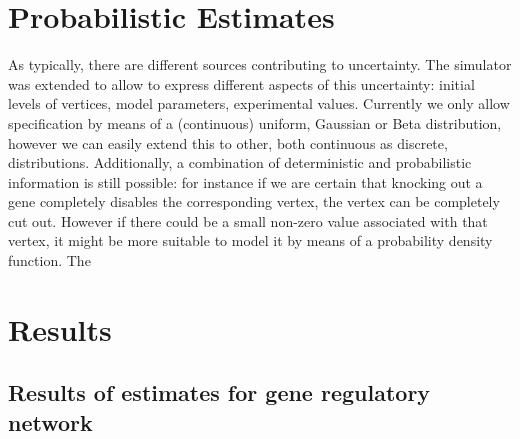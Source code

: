 \section{Probabilistic Estimates}
As typically, there are different sources contributing to uncertainty. The simulator was extended to allow to express different aspects of this uncertainty: initial levels of vertices, model parameters, experimental values.
Currently we only allow specification by means of a (continuous) uniform, Gaussian or Beta distribution, however we can easily extend this to other, both continuous as discrete, distributions.	
Additionally, a combination of deterministic and probabilistic information is still possible: for instance if we are certain that knocking out a gene completely disables the corresponding vertex, the vertex can be completely cut out. However if
there could be a small non-zero value associated with that vertex, it might be more suitable to model it by means of a probability density function. The 
\section{Results}
\subsection{Results of estimates for gene regulatory network}
